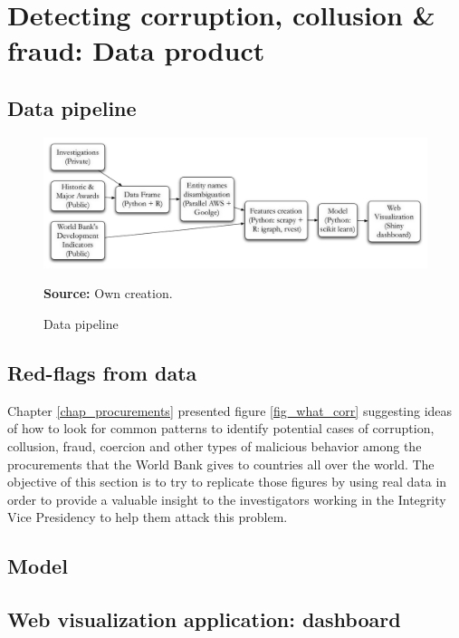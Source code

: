 \chapter{Detecting corruption, collusion \& fraud: Data product}\label{chap_product}

\section{Data pipeline}
\begin{figure}[H]
\begin{center}
\caption{Data pipeline}
\label{fig_pipeline}
\includegraphics[width=\textwidth,height=1\textheight,keepaspectratio]{../img/pipeline.pdf}
\end{center}
\noindent \footnotesize{\textbf{Source:} Own creation.}
\end{figure}

\section{Red-flags from data}

Chapter \ref{chap_procurements} presented figure \ref{fig_what_corr} suggesting ideas of how to look for common patterns to identify potential cases of corruption, collusion, fraud, coercion and other types of malicious behavior among the procurements that the World Bank gives to countries all over the world. The objective of this section is to try to replicate those figures by using real data in order to provide a valuable insight to the investigators working in the Integrity Vice Presidency to help them attack this problem.



\section{Model}

\section{Web visualization application: dashboard}


